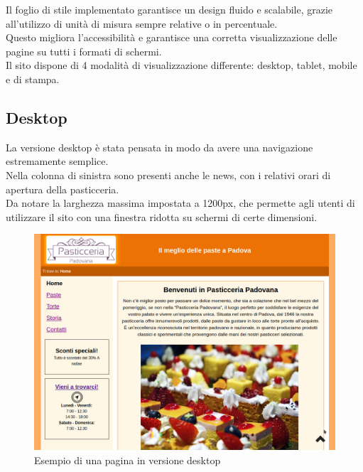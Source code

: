 Il foglio di stile implementato garantisce un design fluido e scalabile, grazie all'utilizzo di unità di misura
sempre relative o in percentuale. \\Questo migliora l'accessibilità e garantisce una corretta visualizzazione delle pagine
su tutti i formati di schermi. \\Il sito dispone di 4 modalità di visualizzazione differente: desktop, tablet, mobile e di stampa.

\subsection{Desktop}
La versione desktop è stata pensata in modo da avere una navigazione estremamente semplice.\\ 
Nella colonna di sinistra sono presenti anche le news, con i relativi orari di apertura della pasticceria.\\ 
Da notare la larghezza massima impostata a 1200px, che permette agli utenti di utilizzare il sito con una finestra ridotta su schermi di certe dimensioni.

\begin{figure}[!h]
	\centering
	\includegraphics[width=1\linewidth]{sezioni/Progettazione/Immagini/desktop_example.png}
	\caption{Esempio di una pagina in versione desktop}
	\label{Fig:verDesktop}
\end{figure}
\newpage
